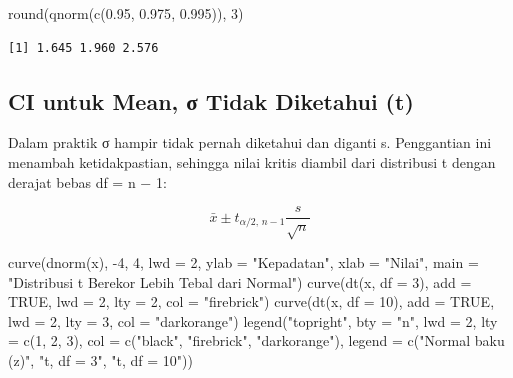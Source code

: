 \documentclass[
  indonesian,
  letterpaper,
]{book}
\newenvironment{Shaded}{\begin{snugshade}}{\end{snugshade}}
\newcommand{\AttributeTok}[1]{\textcolor[rgb]{0.40,0.45,0.13}{#1}}
\newcommand{\ConstantTok}[1]{\textcolor[rgb]{0.56,0.35,0.01}{#1}}
\newcommand{\DecValTok}[1]{\textcolor[rgb]{0.68,0.00,0.00}{#1}}
\newcommand{\FloatTok}[1]{\textcolor[rgb]{0.68,0.00,0.00}{#1}}
\newcommand{\FunctionTok}[1]{\textcolor[rgb]{0.28,0.35,0.67}{#1}}
\newcommand{\NormalTok}[1]{\textcolor[rgb]{0.00,0.23,0.31}{#1}}
\newcommand{\SpecialCharTok}[1]{\textcolor[rgb]{0.37,0.37,0.37}{#1}}
\newcommand{\StringTok}[1]{\textcolor[rgb]{0.13,0.47,0.30}{#1}}
\begin{document}
\begin{Shaded}
\begin{Highlighting}[]
\FunctionTok{round}\NormalTok{(}\FunctionTok{qnorm}\NormalTok{(}\FunctionTok{c}\NormalTok{(}\FloatTok{0.95}\NormalTok{, }\FloatTok{0.975}\NormalTok{, }\FloatTok{0.995}\NormalTok{)), }\DecValTok{3}\NormalTok{)}
\end{Highlighting}
\end{Shaded}

\begin{verbatim}
[1] 1.645 1.960 2.576
\end{verbatim}

\subsection{CI untuk Mean, σ Tidak Diketahui
(t)}\label{ci-untuk-mean-ux3c3-tidak-diketahui-t}

Dalam praktik σ hampir tidak pernah diketahui dan diganti s. Penggantian
ini menambah ketidakpastian, sehingga nilai kritis diambil dari
distribusi t dengan derajat bebas df = n − 1:

\[\bar{x} \pm t_{\alpha/2,\, n-1} \frac{s}{\sqrt{n}}\]

\begin{Shaded}
\begin{Highlighting}[]
\FunctionTok{curve}\NormalTok{(}\FunctionTok{dnorm}\NormalTok{(x), }\SpecialCharTok{{-}}\DecValTok{4}\NormalTok{, }\DecValTok{4}\NormalTok{, }\AttributeTok{lwd =} \DecValTok{2}\NormalTok{, }\AttributeTok{ylab =} \StringTok{"Kepadatan"}\NormalTok{, }\AttributeTok{xlab =} \StringTok{"Nilai"}\NormalTok{,}
\AttributeTok{main =} \StringTok{"Distribusi t Berekor Lebih Tebal dari Normal"}\NormalTok{)}
\FunctionTok{curve}\NormalTok{(}\FunctionTok{dt}\NormalTok{(x, }\AttributeTok{df =} \DecValTok{3}\NormalTok{), }\AttributeTok{add =} \ConstantTok{TRUE}\NormalTok{, }\AttributeTok{lwd =} \DecValTok{2}\NormalTok{, }\AttributeTok{lty =} \DecValTok{2}\NormalTok{, }\AttributeTok{col =} \StringTok{"firebrick"}\NormalTok{)}
\FunctionTok{curve}\NormalTok{(}\FunctionTok{dt}\NormalTok{(x, }\AttributeTok{df =} \DecValTok{10}\NormalTok{), }\AttributeTok{add =} \ConstantTok{TRUE}\NormalTok{, }\AttributeTok{lwd =} \DecValTok{2}\NormalTok{, }\AttributeTok{lty =} \DecValTok{3}\NormalTok{, }\AttributeTok{col =} \StringTok{"darkorange"}\NormalTok{)}
\FunctionTok{legend}\NormalTok{(}\StringTok{"topright"}\NormalTok{, }\AttributeTok{bty =} \StringTok{"n"}\NormalTok{, }\AttributeTok{lwd =} \DecValTok{2}\NormalTok{, }\AttributeTok{lty =} \FunctionTok{c}\NormalTok{(}\DecValTok{1}\NormalTok{, }\DecValTok{2}\NormalTok{, }\DecValTok{3}\NormalTok{), }\AttributeTok{col =} \FunctionTok{c}\NormalTok{(}\StringTok{"black"}\NormalTok{, }\StringTok{"firebrick"}\NormalTok{, }\StringTok{"darkorange"}\NormalTok{),}
\AttributeTok{legend =} \FunctionTok{c}\NormalTok{(}\StringTok{"Normal baku (z)"}\NormalTok{, }\StringTok{"t, df = 3"}\NormalTok{, }\StringTok{"t, df = 10"}\NormalTok{))}
\end{Highlighting}
\end{Shaded}
\end{document}
